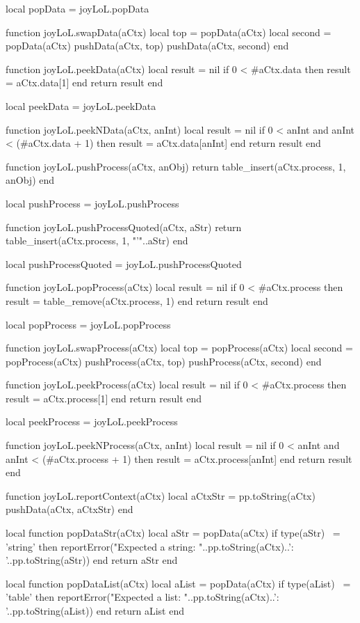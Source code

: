 local popData = joyLoL.popData

function joyLoL.swapData(aCtx)
  local top    = popData(aCtx)
  local second = popData(aCtx)
  pushData(aCtx, top)
  pushData(aCtx, second)
end

function joyLoL.peekData(aCtx)
  local result = nil
  if 0 < #aCtx.data then
    result = aCtx.data[1]
  end
  return result
end

local peekData = joyLoL.peekData

function joyLoL.peekNData(aCtx, anInt)
  local result = nil
  if 0 < anInt and anInt < (#aCtx.data + 1) then
    result = aCtx.data[anInt]
  end
  return result
end

function joyLoL.pushProcess(aCtx, anObj)
  return table_insert(aCtx.process, 1, anObj)
end

local pushProcess = joyLoL.pushProcess

function joyLoL.pushProcessQuoted(aCtx, aStr)
  return table_insert(aCtx.process, 1, "'"..aStr)
end

local pushProcessQuoted = joyLoL.pushProcessQuoted

function joyLoL.popProcess(aCtx)
  local result = nil
  if 0 < #aCtx.process then
    result = table_remove(aCtx.process, 1)
  end
  return result
end

local popProcess = joyLoL.popProcess

function joyLoL.swapProcess(aCtx)
  local top    = popProcess(aCtx)
  local second = popProcess(aCtx)
  pushProcess(aCtx, top)
  pushProcess(aCtx, second)
end

function joyLoL.peekProcess(aCtx)
  local result = nil
  if 0 < #aCtx.process then
    result = aCtx.process[1]
  end
  return result
end

local peekProcess = joyLoL.peekProcess

function joyLoL.peekNProcess(aCtx, anInt)
  local result = nil
  if 0 < anInt and anInt < (#aCtx.process + 1) then
    result = aCtx.process[anInt]
  end
  return result
end

function joyLoL.reportContext(aCtx)
  local aCtxStr = pp.toString(aCtx)
  pushData(aCtx, aCtxStr)
end

local function popDataStr(aCtx)
  local aStr = popData(aCtx)
  if type(aStr) ~= 'string' then
    reportError("Expected a string\naCtx: "..pp.toString(aCtx)..'\naStr: '..pp.toString(aStr))
  end
  return aStr
end

local function popDataList(aCtx)
  local aList = popData(aCtx)
  if type(aList) ~= 'table' then
    reportError("Expected a list\naCtx: "..pp.toString(aCtx)..'\naList: '..pp.toString(aList))
  end
  return aList
end

